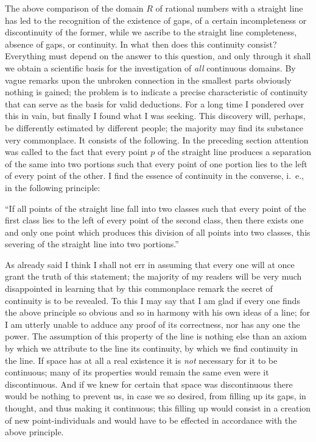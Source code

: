 \documentclass[oneside]{book}
\begin{document}
The above comparison of the domain $R$ of rational
numbers with a straight line has led to the recognition
of the existence of gaps, of a certain incompleteness
or discontinuity of the former, while we ascribe to the
straight line completeness, absence of gaps, or continuity.
In what then does this continuity consist?
Everything must depend on the answer to this question,
and only through it shall we obtain a scientific
basis for the investigation of \textit{all} continuous domains.
By vague remarks upon the unbroken connection in
the smallest parts obviously nothing is gained; the
problem is to indicate a precise characteristic of continuity
that can serve as the basis for valid deductions.
For a long time I pondered over this in vain, but
finally I found what I was seeking. This discovery
will, perhaps, be differently estimated by different
people; the majority may find its substance very commonplace.
It consists of the following. In the preceding
section attention was called to the fact that
every point $p$ of the straight line produces a separation
of the same into two portions such that every
point of one portion lies to the left of every point of
the other. I find the essence of continuity in the converse,
i.~e., in the following principle:

``If all points of the straight line fall into two
classes such that every point of the first class lies to
the left of every point of the second class, then there
exists one and only one point which produces this division
of all points into two classes, this severing of
the straight line into two portions.''

As already said I think I shall not err in assuming
that every one will at once grant the truth of this
statement; the majority of my readers will be very
much disappointed in learning that by this commonplace
remark the secret of continuity is to be revealed.
To this I may say that I am glad if every one finds
the above principle so obvious and so in harmony
with his own ideas of a line; for I am utterly unable
to adduce any proof of its correctness, nor has any
one the power. The assumption of this property of
the line is nothing else than an axiom by which we
attribute to the line its continuity, by which we find
continuity in the line. If space has at all a real existence
it is \textit{not} necessary for it to be continuous;
many of its properties would remain the same even
were it discontinuous. And if we knew for certain
that space was discontinuous there would be nothing
to prevent us, in case we so desired, from filling up
its gaps, in thought, and thus making it continuous;
this filling up would consist in a creation of new point-individuals
and would have to be effected in accordance
with the above principle.
\end{document}

